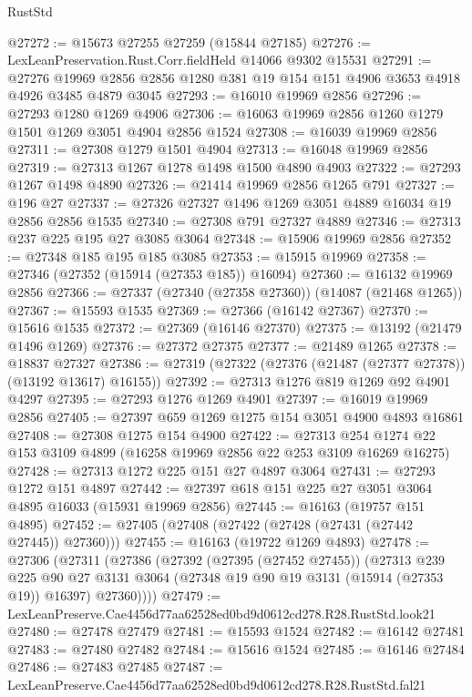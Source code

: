 \begin{lexlean}{RustStd}
\begin{coremodule}
@27272 := @15673 @27255 @27259 (@15844 @27185)
@27276 := LexLeanPreservation.Rust.Corr.fieldHeld @14066 @9302 @15531
@27291 := @27276
    @19969
    @2856
    @2856
    @1280
    @381
    @19
    @154
    @151
    @4906
    @3653
    @4918
    @4926
    @3485
    @4879
    @3045
@27293 := @16010 @19969 @2856
@27296 := @27293 @1280 @1269 @4906
@27306 := @16063 @19969 @2856 @1260 @1279 @1501 @1269 @3051 @4904 @2856 @1524
@27308 := @16039 @19969 @2856
@27311 := @27308 @1279 @1501 @4904
@27313 := @16048 @19969 @2856
@27319 := @27313 @1267 @1278 @1498 @1500 @4890 @4903
@27322 := @27293 @1267 @1498 @4890
@27326 := @21414 @19969 @2856 @1265 @791
@27327 := @196 @27
@27337 := @27326 @27327 @1496 @1269 @3051 @4889 @16034 @19 @2856 @2856 @1535
@27340 := @27308 @791 @27327 @4889
@27346 := @27313 @237 @225 @195 @27 @3085 @3064
@27348 := @15906 @19969 @2856
@27352 := @27348 @185 @195 @185 @3085
@27353 := @15915 @19969
@27358 := @27346 (@27352 (@15914 (@27353 @185)) @16094)
@27360 := @16132 @19969 @2856
@27366 := @27337 (@27340 (@27358 @27360)) (@14087 (@21468 @1265))
@27367 := @15593 @1535
@27369 := @27366 (@16142 @27367)
@27370 := @15616 @1535
@27372 := @27369 (@16146 @27370)
@27375 := @13192 (@21479 @1496 @1269)
@27376 := @27372 @27375
@27377 := @21489 @1265
@27378 := @18837 @27327
@27386 := @27319 (@27322 (@27376 (@21487 (@27377 @27378)) (@13192 @13617) @16155))
@27392 := @27313 @1276 @819 @1269 @92 @4901 @4297
@27395 := @27293 @1276 @1269 @4901
@27397 := @16019 @19969 @2856
@27405 := @27397 @659 @1269 @1275 @154 @3051 @4900 @4893 @16861
@27408 := @27308 @1275 @154 @4900
@27422 := @27313 @254 @1274 @22 @153 @3109 @4899 (@16258 @19969 @2856 @22 @253 @3109 @16269 @16275)
@27428 := @27313 @1272 @225 @151 @27 @4897 @3064
@27431 := @27293 @1272 @151 @4897
@27442 := @27397 @618 @151 @225 @27 @3051 @3064 @4895 @16033 (@15931 @19969 @2856)
@27445 := @16163 (@19757 @151 @4895)
@27452 := @27405 (@27408 (@27422 (@27428 (@27431 (@27442 @27445)) @27360)))
@27455 := @16163 (@19722 @1269 @4893)
@27478 := @27306
    (@27311
      (@27386
        (@27392
          (@27395 (@27452 @27455))
          (@27313
            @239
            @225
            @90
            @27
            @3131
            @3064
            (@27348 @19 @90 @19 @3131 (@15914 (@27353 @19)) @16397)
            @27360))))
@27479 := LexLeanPreserve.Cae4456d77aa62528ed0bd9d0612cd278.R28.RustStd.look21
@27480 := @27478 @27479
@27481 := @15593 @1524
@27482 := @16142 @27481
@27483 := @27480 @27482
@27484 := @15616 @1524
@27485 := @16146 @27484
@27486 := @27483 @27485
@27487 := LexLeanPreserve.Cae4456d77aa62528ed0bd9d0612cd278.R28.RustStd.fal21

\end{coremodule}
\end{lexlean}

